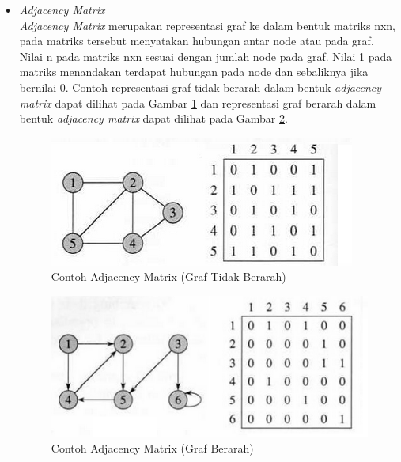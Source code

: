 \begin{itemize}
  \item \textit{Adjacency Matrix}\\
  \textit{Adjacency Matrix} merupakan representasi graf ke dalam bentuk matriks
  nxn, pada matriks tersebut menyatakan hubungan antar node atau pada graf.
  Nilai n pada matriks nxn sesuai dengan jumlah node pada graf. Nilai 1 pada
  matriks menandakan terdapat hubungan pada node dan sebaliknya jika bernilai
  0. Contoh representasi graf tidak berarah dalam bentuk \textit{adjacency
  matrix} dapat dilihat pada Gambar \ref{fig:adjmat_undirec} dan representasi
  graf berarah dalam bentuk \textit{adjacency matrix} dapat dilihat pada Gambar
  \ref{fig:adjmat_direc}.
  
\begin{figure}[h]
\centering
\includegraphics[scale=1]{Gambar/adjmat_undirec}
\caption[Contoh Adjacency Matrix]{Contoh Adjacency Matrix (Graf Tidak Berarah)}
\label{fig:adjmat_undirec}
\end{figure}

\begin{figure}[h]
\centering
\includegraphics[scale=1]{Gambar/adjmat_direc}
\caption[Contoh Adjacency Matrix]{Contoh Adjacency Matrix (Graf Berarah)}
\label{fig:adjmat_direc}
\end{figure}
\end{itemize}

